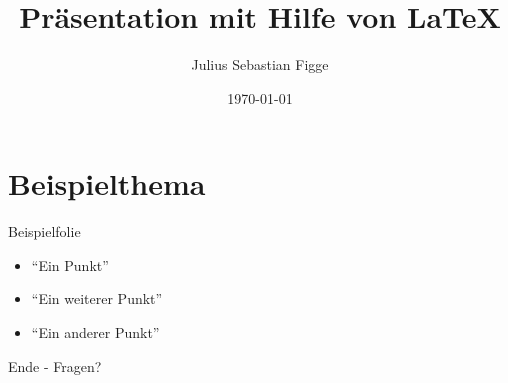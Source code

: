 \documentclass[xcolor=dvipsnames,11pt]{beamer}
\author{Julius Sebastian Figge}
\title[FHDW Präsentation Template]{Präsentation mit Hilfe von \LaTeX}
\date{\today}
\begin{document}
\begin{frame}
\titlepage
\end{frame}

\frame{\tableofcontents}

\section{Beispielthema}

\begin{frame}{Beispielfolie}
\begin{itemize}
	\item \enquote{Ein Punkt} 
	\item \enquote{Ein weiterer Punkt} 
	\item \enquote{Ein anderer Punkt} 
\end{itemize}
\end{frame}

\begin{frame}
\center \huge Ende - Fragen?
\end{frame}
\end{document}
